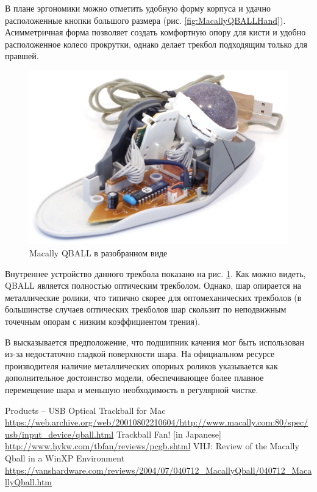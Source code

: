 \documentclass[11pt, a4paper]{article}
\begin{document}
В плане эргономики можно отметить удобную форму корпуса и удачно расположенные кнопки большого размера (рис. \ref{fig:MacallyQBALLHand}). Асимметричная форма позволяет создать комфортную опору для кисти и удобно расположенное колесо прокрутки, однако делает трекбол подходящим только для правшей.

\begin{figure}[h]
    \centering
    \includegraphics[scale=0.7]{2001_macally_qball/inside_60.jpg}
    \caption{Macally QBALL в разобранном виде}
    \label{fig:MacallyQBALLInside}
\end{figure}

Внутреннее устройство данного трекбола показано на рис. \ref{fig:MacallyQBALLInside}. Как можно видеть, QBALL является полностью оптическим трекболом. Однако, шар опирается на металлические ролики, что типично скорее для оптомеханических трекболов (в большинстве случаев оптических трекболов шар скользит по неподвижным точечным опорам с низким коэффициентом трения).

В \cite{trackballfan} высказывается предположение, что подшипник качения мог быть использован из-за недостаточно гладкой поверхности шара. На официальном ресурсе производителя \cite{site} наличие металлических опорных роликов указывается как дополнительное достоинство модели, обеспечивающее более плавное перемещение шара и меньшую необходимость в регулярной чистке.

\begin{thebibliography}{9}
 Products -- USB Optical Trackball for Mac \url{https://web.archive.org/web/20010802210604/http://www.macally.com:80/spec/usb/input_device/qball.html}
 Trackball Fan! [in Japanese] \url{http://www.hykw.com/tbfan/reviews/pcgb.shtml}
 VHJ: Review of the Macally Qball in a WinXP Environment \url{https://vanshardware.com/reviews/2004/07/040712_MacallyQball/040712_MacallyQball.htm}
\end{thebibliography}
\end{document}
